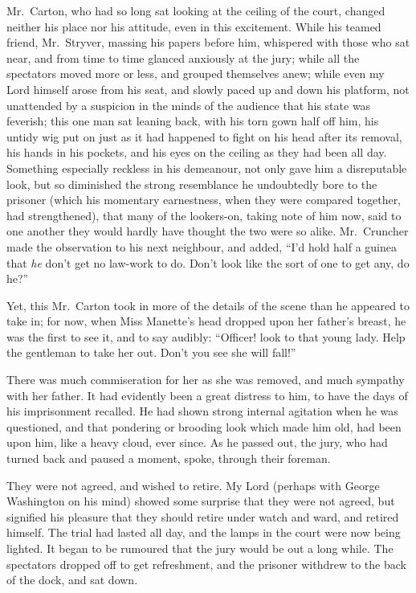 Mr.\ Carton, who had so long sat looking at the ceiling of the court,
changed neither his place nor his attitude, even in this excitement.
While his teamed friend, Mr.\ Stryver, massing his papers before him,
whispered with those who sat near, and from time to time glanced
anxiously at the jury; while all the spectators moved more or less,
and grouped themselves anew; while even my Lord himself arose from his
seat, and slowly paced up and down his platform, not unattended by a
suspicion in the minds of the audience that his state was feverish;
this one man sat leaning back, with his torn gown half off him, his
untidy wig put on just as it had happened to fight on his head after
its removal, his hands in his pockets, and his eyes on the ceiling as
they had been all day.  Something especially reckless in his demeanour,
not only gave him a disreputable look, but so diminished the strong
resemblance he undoubtedly bore to the prisoner (which his momentary
earnestness, when they were compared together, had strengthened),
that many of the lookers-on, taking note of him now, said to one
another they would hardly have thought the two were so alike.
Mr.\ Cruncher made the observation to his next neighbour, and added,
``I'd hold half a guinea that \emph{he} don't get no law-work to do.
Don't look like the sort of one to get any, do he?''

Yet, this Mr.\ Carton took in more of the details of the scene than he
appeared to take in; for now, when Miss Manette's head dropped upon
her father's breast, he was the first to see it, and to say audibly:
``Officer! look to that young lady.  Help the gentleman to take her out.
Don't you see she will fall!''

There was much commiseration for her as she was removed, and much
sympathy with her father.  It had evidently been a great distress to
him, to have the days of his imprisonment recalled.  He had shown
strong internal agitation when he was questioned, and that pondering
or brooding look which made him old, had been upon him, like a heavy
cloud, ever since.  As he passed out, the jury, who had turned back
and paused a moment, spoke, through their foreman.

They were not agreed, and wished to retire.  My Lord (perhaps with
George Washington on his mind) showed some surprise that they were not
agreed, but signified his pleasure that they should retire under watch
and ward, and retired himself.  The trial had lasted all day, and the
lamps in the court were now being lighted.  It began to be rumoured
that the jury would be out a long while.  The spectators dropped off
to get refreshment, and the prisoner withdrew to the back of the dock,
and sat down.

